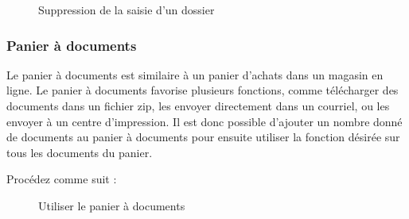 \begin{figure}[H]
\caption{Suppression de la saisie d'un dossier}
\end{figure}


\subsubsection{Panier à documents}
\label{bkm:Ref201705445}

Le panier à documents est similaire à un panier d'achats dans un magasin en ligne. Le panier à documents favorise plusieurs fonctions, comme télécharger des documents dans un fichier zip, les envoyer directement dans un courriel, ou les envoyer à un centre d'impression. Il est donc possible d'ajouter un nombre donné de documents au panier à documents pour ensuite utiliser la fonction désirée sur tous les documents du panier.

\vspace{\baselineskip}

Procédez comme suit :

\begin{figure}[H]
\caption{Utiliser le panier à documents}
\end{figure}

